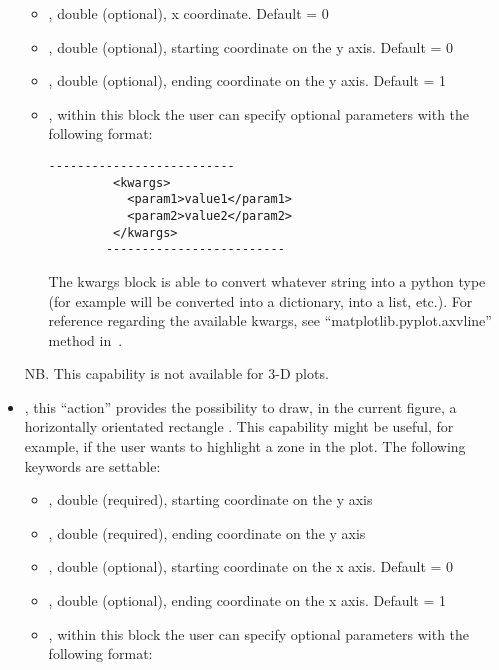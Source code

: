 \begin{itemize}
    \begin{itemize}
    \item \textit{}, double (optional), x coordinate.
    Default = 0
    \item \textit{}, double (optional), starting coordinate on the y
    axis.
    Default = 0
    \item \textit{}, double (optional), ending coordinate on the y axis.
    Default = 1
    \item \textit{}, within this block the user can specify optional
    parameters with the following format:
        \begin{lstlisting}[style=XML]
        --------------------------
         <kwargs>
           <param1>value1</param1>
           <param2>value2</param2>
         </kwargs>
        -------------------------
       \end{lstlisting}
    The kwargs block is able to convert whatever string into a python type (for
    example  will be converted into a
    dictionary,  into a list, etc.).
    For reference regarding the available kwargs, see
    ``matplotlib.pyplot.axvline'' method in~\cite{MatPlotLib}.
      \end{itemize}
  NB.
  This capability is not available for 3-D plots.
  \item {}, this ``action'' provides the possibility to
  draw, in the current figure, a horizontally orientated rectangle .
  This capability might be useful, for example, if the user wants to highlight a
  zone in the plot.
  The following keywords are settable:
    \begin{itemize}
    \item \textit{}, double (required), starting coordinate on the y
    axis
    \item \textit{}, double (required), ending coordinate on the y axis
    \item \textit{}, double (optional), starting coordinate on the x
    axis.
    Default = 0
    \item \textit{}, double (optional), ending coordinate on the x axis.
    Default = 1
    \item \textit{}, within this block the user can specify optional
    parameters with the following format:

\end{itemize}
\end{itemize}
